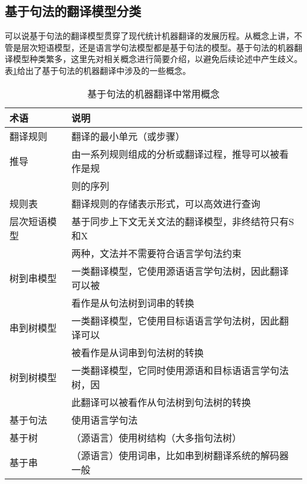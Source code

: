 
\subsection{基于句法的翻译模型分类}

\parinterval 可以说基于句法的翻译模型贯穿了现代统计机器翻译的发展历程。从概念上讲，不管是层次短语模型，还是语言学句法模型都是基于句法的模型。基于句法的机器翻译模型种类繁多，这里先对相关概念进行简要介绍，以避免后续论述中产生歧义。表\ref{tab:8-2}给出了基于句法的机器翻译中涉及的一些概念。

\begin{table}[htp]{
\begin{center}
\caption{基于句法的机器翻译中常用概念}
\label{tab:8-2}
{
\begin{tabular}{p{6.5em} | l}
术语 & 说明 \\
\hline
\rule{0pt}{15pt}翻译规则 & 翻译的最小单元（或步骤） \\
\rule{0pt}{15pt}推导 & 由一系列规则组成的分析或翻译过程，推导可以被看作是规\\
&则的序列 \\
\rule{0pt}{15pt}规则表 & 翻译规则的存储表示形式，可以高效进行查询 \\
\rule{0pt}{15pt}层次短语模型 & 基于同步上下文无关文法的翻译模型，非终结符只有S和X\\
&两种，文法并不需要符合语言学句法约束 \\
\rule{0pt}{15pt}树到串模型 & 一类翻译模型，它使用源语语言学句法树，因此翻译可以被\\
&看作是从句法树到词串的转换 \\
\rule{0pt}{15pt}串到树模型 & 一类翻译模型，它使用目标语语言学句法树，因此翻译可以\\
&被看作是从词串到句法树的转换 \\
\rule{0pt}{15pt}树到树模型 & 一类翻译模型，它同时使用源语和目标语语言学句法树，因\\
&此翻译可以被看作从句法树到句法树的转换 \\
\rule{0pt}{15pt}基于句法 & 使用语言学句法 \\
\rule{0pt}{15pt}基于树 &（源语言）使用树结构（大多指句法树） \\
\rule{0pt}{15pt}基于串 &（源语言）使用词串，比如串到树翻译系统的解码器一般\\

\end{tabular}}
\end{center}}
\end{table}
